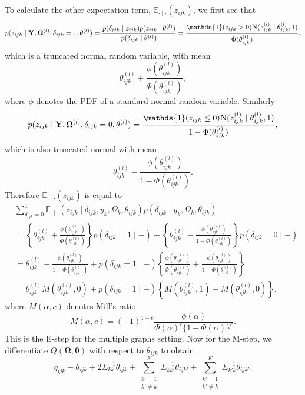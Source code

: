 \documentclass[a4paper, 11pt, oneside]{report}
\newcommand{\E}{\mathbb{E}}
\newcommand{\1}{\mathds{1}}
\newcommand{\powl}{^{(l)}}
\newcommand{\inv}{^{-1}}
\newcommand{\Nor}{\textsc{N}}
\newcommand{\bOmega}{\mathbf{\Omega}}
\newcommand{\btheta}{\mathbf{\theta}}
\newcommand{\tijkl}{\theta_{ijk}\powl}
\newcommand{\bY}{\mathbf{Y}}
\begin{document}
To calculate the other expectation term, $\E_{\cdot \mid \cdot}(z_{ijk})$, we
first see that
\[
	p(z_{ijk} \mid \bY, \bOmega\powl, \delta_{ijk} = 1, \btheta\powl) =
	\frac{p(\delta_{ijk} \mid z_{ijk})p(z_{ijk} \mid
		\btheta\powl)}{p(\delta_{ijk} \mid \btheta\powl)} = \frac{\1(z_{ijk} > 0)
		\Nor(z_{ijk} \powl \mid \theta_{ijk}\powl, 1)}{\Phi(\theta_{ijk}\powl)},
\]
which is a truncated normal random variable, with mean
\[\theta_{ijk}\powl + \frac{\phi(\theta_{ijk}\powl)}{\Phi(\theta_{ijk}\powl)},\]
where $\phi$ denotes the PDF of a standard normal random variable.
Similarly
\[
	p(z_{ijk} \mid \bY, \bOmega\powl, \delta_{ijk} = 0, \btheta\powl)
	=\frac{\1(z_{ijk} \leq 0) \Nor(z_{ijk} \powl \mid \theta_{ijk}\powl, 1)}{1
		- \Phi(\theta_{ijk}\powl)},
\]
which is also truncated normal with mean
\[
	\theta_{ijk}\powl - \frac{\phi(\theta_{ijk}\powl)}{1 - \Phi(\theta_{ijk}\powl)}.
\]
Therefore $\E_{\cdot \mid \cdot}(z_{ijk})$ is equal to
\begin{align*}
	 & \sum_{\delta_{ijk} = 0}^1 \E_{\cdot \mid
		\cdot}\left(z_{ijk} \mid \delta_{ijk}, y_k, \Omega_k, \theta_{ijk}\right)
	p(\delta_{ijk} \mid y_k, \Omega_k, \theta_{ijk})                               \\
	 & = \left\{\tijkl +
	\frac{\phi(\tijkl)}{\Phi(\tijkl)}\right\}
	p(\delta_{ijk} = 1 \mid -) + \left\{\theta_{ijk}\powl -
	\frac{\phi(\theta_{ijk}\powl)}{1 -
	\Phi(\theta_{ijk}\powl)}\right\}p(\delta_{ijk} = 0 \mid -) \label{eq:expect-z} \\
	 & = \tijkl - \frac{\phi(\tijkl)}{1 - \Phi(\tijkl)} + p(\delta_{ijk} = 1
	\mid -) \left\{\frac{\phi(\tijkl)}{\Phi(\tijkl)} + \frac{\phi(\tijkl)}{1
	- \Phi(\tijkl)}\right\}                                                        \\
	 & = \tijkl M\left(\tijkl, 0\right) + p(\delta_{ijk} = 1 \mid
	-)\left\{M\left(\tijkl, 1\right) -
	M\left(\tijkl, 0\right)\right\},
\end{align*}
where $M(\alpha, c)$ denotes Mill's ratio
\[
	M(\alpha, c) = (-1)^{1-c}\frac{\phi(\alpha)}{\Phi(\alpha)^c \{1 - \Phi(\alpha)\}^c}.
\]
This is the E-step for the multiple graphs setting.
Now for the M-step, we differentiate $Q(\bOmega, \btheta)$ with respect to
$\theta_{ijk}$ to obtain
\begin{equation}\label{eq:dQdtheta}
	q_{ijk} - \theta_{ijk} + 2\Sigma_{kk}\inv \theta_{ijk} + \sum_{\substack
		{k' = 1 \\ k' \neq k}}^K \Sigma_{k k'}\inv \theta_{ijk'} + \sum_{\substack{k' = 1 \\ k' \neq k}}^K
	\Sigma_{k' k}\inv \theta_{ijk'}.
\end{equation}
\end{document}

